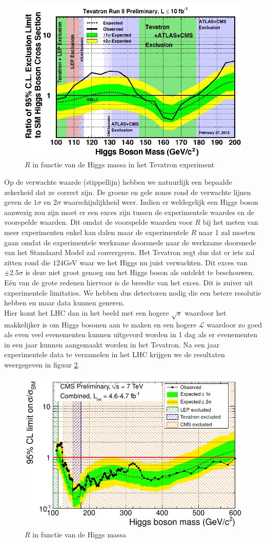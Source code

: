\documentclass[../main.tex]{subfiles}
\begin{document}
\begin{figure}[h]
    \centering
    \includegraphics[width=0.6\linewidth]{higgs_boson/zoektoacht_h_tevatron.png}
    \caption{$R$ in functie van de Higgs massa in het Tevatron experiment}%
    \label{fig:higgs_boson/zoektoacht_h_tevatron}
\end{figure}

Op de verwachte waarde (stippellijn) hebben we natuurlijk een bepaalde zekerheid dat ze correct zijn. De groene en gele zones rond de verwachte lijnen geven de $1\sigma$ en $2\sigma$ waarschijnlijkheid weer. Indien er weldegelijk een Higgs boson aanwezig zou zijn moet er een exces zijn tussen de experimentele waardes en de voorspelde waarden. Dit omdat de voorspelde waarden voor $R$ bij het meten van meer experimenten enkel kan dalen maar de experimentele $R$ naar 1 zal moeten gaan omdat de experimentele werkzame doorsnede naar de werkzame doorsnede van het Standaard Model zal convergeren. Het Tevatron zegt dus dat er iets zal zitten rond die $124$GeV waar we het Higgs nu juist verwachten. Dit exces van $\pm 2.5\sigma$ is deze niet groot genoeg om het Higgs boson als ontdekt te beschouwen. Eén van de grote redenen hiervoor is de breedte van het exces. Dit is zuiver uit experimentele limitaties. We hebben dus detectoren nodig die een betere resolutie hebben en maar data kunnen generen.\\
Hier komt het LHC dan in het beeld met een hogere $\sqrt{s}$ waardoor het makkelijker is om Higgs bosonen aan te maken en een hogere $\mathcal{L}$ waardoor zo goed als even veel evenementen kunnen uitgevord worden in 1 dag als er evenementen in een jaar kunnen aangemaakt worden in het Tevatron. Na een jaar experimentele data te verzamelen in het LHC krijgen we de resultaten weergegeven in figuur \ref{fig:higgs_boson/zoektocht_naar_h}.

\begin{figure}[h]
    \centering
    \includegraphics[width=0.6\linewidth]{higgs_boson/zoektocht_naar_h.png}
    \caption{$R$ in functie van de Higgs massa}%
    \label{fig:higgs_boson/zoektocht_naar_h}
\end{figure}
\end{document}
